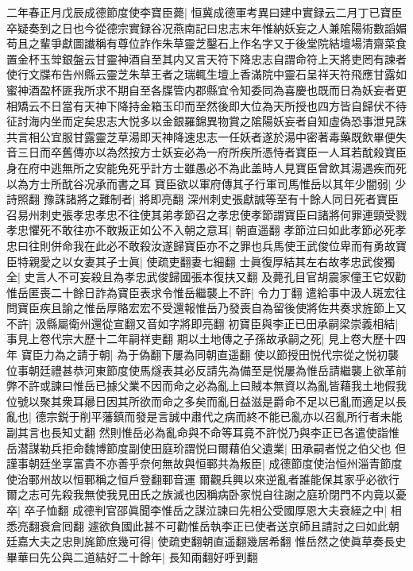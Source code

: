 二年春正月戊辰成德節度使李寶臣薨|{
	恒冀成德軍考異曰建中實録云二月丁已寶臣卒疑奏到之日也今從德宗實録谷况燕南記曰忠志末年惟納妖妄之人兼隂陽術數謟媚苟且之輩爭獻圖䜟稱有尊位詐作朱草靈芝鑿石上作名字又于後堂院結壇場清齋菜食置金杯玉斚銀盤云甘靈神酒自至其内又言天符下降忠志自謂命符上天將吏罔有諫者使行文牒布告州縣云靈芝朱草王者之瑞輒生壇上香滿院中靈石呈祥天符飛應甘露如蜜神酒盈杯匪我所求不期自至各牒管内郡縣宜令知委同為喜慶也既而日為妖妄者更相矯云不日當有天神下降持金箱玉印而至然後即大位為天所授也四方皆自歸伏不待征討海内坐而定矣忠志大悦多以金銀羅錦異物賞之隂陽妖妄者自知虛偽恐事泄見誅共言相公宜服甘露靈芝草湯即天神降速忠志一任妖者遂於湯中密著毒藥既飲畢便失音三日而卒舊傳亦以為然按方士妖妄必為一府所疾所憑恃者寶臣一人耳若酖殺寶臣身在府中逃無所之安能免死乎計方士雖愚必不為此盖時人見寶臣曾飲其湯遇疾而死以為方士所酖谷况承而書之耳}
寶臣欲以軍府傳其子行軍司馬惟岳以其年少闇弱|{
	少詩照翻}
豫誅諸將之難制者|{
	將即亮翻}
深州刺史張獻誠等至有十餘人同日死者寶臣召易州刺史張孝忠孝忠不往使其弟孝節召之孝忠使孝節謂寶臣曰諸將何罪連頸受戮孝忠懼死不敢往亦不敢叛正如公不入朝之意耳|{
	朝直遥翻}
孝節泣曰如此孝節必死孝忠曰往則併命我在此必不敢殺汝遂歸寶臣亦不之罪也兵馬使王武俊位卑而有勇故寶臣特親愛之以女妻其子士眞|{
	使疏吏翻妻七細翻}
士眞復厚結其左右故孝忠武俊獨全|{
	史言人不可妄殺且為孝忠武俊歸國張本復扶又翻}
及薨孔目官胡震家僮王它奴勸惟岳匿喪二十餘日詐為寶臣表求令惟岳繼襲上不許|{
	令力丁翻}
遣給事中汲人斑宏往問寶臣疾且諭之惟岳厚賂宏宏不受還報惟岳乃發喪自為留後使將佐共奏求旌節上又不許|{
	汲縣屬衛州還從宣翻又音如字將即亮翻}
初寶臣與李正已田承嗣梁崇義相結|{
	事見上卷代宗大歷十二年嗣祥吏翻}
期以土地傳之子孫故承嗣之死|{
	見上卷大歷十四年}
寶臣力為之請于朝|{
	為于偽翻下屢為同朝直遥翻}
使以節授田悦代宗從之悦初襲位事朝廷禮甚恭河東節度使馬燧表其必反請先為備至是悦屢為惟岳請繼襲上欲革前弊不許或諫曰惟岳已據父業不因而命之必為亂上曰賊本無資以為亂皆藉我土地假我位號以聚其衆耳曏日因其所欲而命之多矣而亂日益滋是爵命不足以已亂而適足以長亂也|{
	德宗鋭于削平藩鎮而發是言誠中肅代之病而終不能已亂亦以召亂所行者未能副其言也長知丈翻}
然則惟岳必為亂命與不命等耳竟不許悦乃與李正已各遣使詣惟岳潜謀勒兵拒命魏博節度副使田庭玠謂悦曰爾藉伯父遺業|{
	田承嗣者悦之伯父也}
但謹事朝廷坐享富貴不亦善乎奈何無故與恒鄆共為叛臣|{
	成德節度使治恒州淄青節度使治鄆州故以恒鄆稱之恒戶登翻鄆音運}
爾觀兵興以來逆亂者誰能保其家乎必欲行爾之志可先殺我無使我見田氏之族滅也因稱病卧家悦自往謝之庭玠閉門不内竟以憂卒|{
	卒子恤翻}
成德判官邵眞聞李惟岳之謀泣諫曰先相公受國厚恩大夫衰絰之中|{
	相悉亮翻衰倉囘翻}
遽欲負國此甚不可勸惟岳執李正已使者送京師且請討之曰如此朝廷嘉大夫之忠則旄節庶幾可得|{
	使疏吏翻朝直遥翻幾居希翻}
惟岳然之使眞草奏長史畢華曰先公與二道結好二十餘年|{
	長知兩翻好呼到翻}
